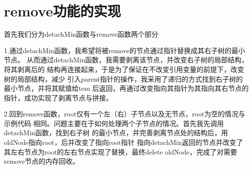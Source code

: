 \documentclass[UTF8]{ctexart}
\begin{document}
\pagestyle{fancy}
\fancyhead{}

\section{remove功能的实现}
首先我们分为detachMin函数与remove函数两个部分 \newline
\newline
\par
1.通过detachMin函数，我希望将被remove的节点通过指针替换成其右子树的最小节点。
从而通过detachMin函数，我需要剥离该节点，并改变右子树的局部结构，将其剥离后的
结构再连接起来，于是为了保证在不改变引用变量的前提下，改变树的局部结构，减少
引入parent指针的操作，我采用了递归的方式找到右子树的最小节点，并将其赋值给tem
后返回，再通过改变指向其指针为其指向其右节点的指针，成功实现了剥离节点与拼接。\newline

2.回到remove函数，root仅有一个左（右）子节点以及无节点，root为空的情况与示例代码
相同。问题主要在于如何处理两个子节点的情况。首先我先调用detachMin函数，找到右子树
的最小节点，并完善剥离节点处的结构后，用oldNode指向root，后并改变了指向root指针
指向detachMin返回的节点并改变了其左右节点为root的左右节点实现了替换，最终delete
oldNode，完成了对需要remove节点的内存回收。
\end{document}
